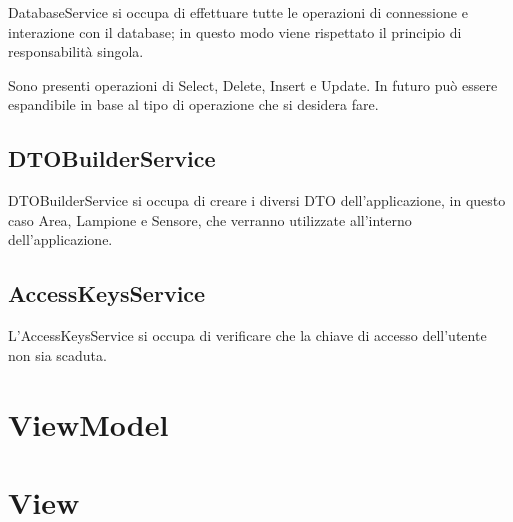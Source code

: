 DatabaseService si occupa di effettuare tutte le operazioni di connessione e interazione con il database; in questo modo viene rispettato il principio di responsabilità singola.

Sono presenti operazioni di Select, Delete, Insert e Update. In futuro può essere espandibile in base al tipo di operazione che si desidera fare.

\subsection{DTOBuilderService}
DTOBuilderService si occupa di creare i diversi DTO dell'applicazione, in questo caso Area, Lampione e Sensore, che verranno utilizzate all'interno dell'applicazione.

\subsection{AccessKeysService}
L'AccessKeysService si occupa di verificare che la chiave di accesso dell'utente non sia scaduta.

\section{ViewModel}

\section{View}


